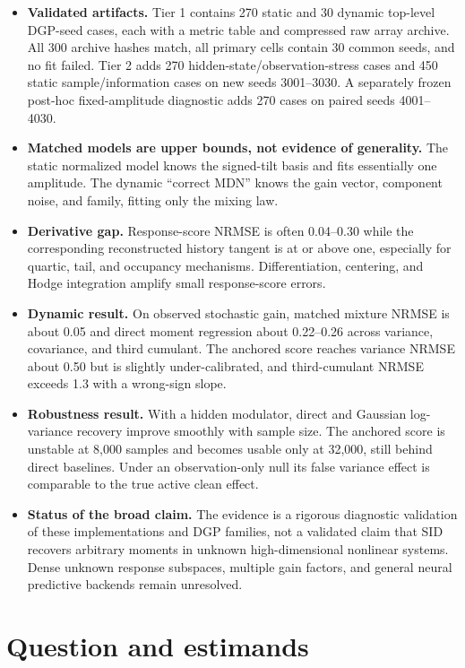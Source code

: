 \documentclass[11pt]{article}
\begin{document}
\begin{itemize}
\item \textbf{Validated artifacts.}  Tier 1 contains 270 static and 30 dynamic
top-level DGP-seed cases, each with a metric table and compressed raw array archive.
All 300 archive hashes match, all primary cells contain 30 common seeds, and no fit
failed.  Tier 2 adds 270 hidden-state/observation-stress cases and 450 static
sample/information cases on new seeds 3001--3030.  A separately frozen post-hoc
fixed-amplitude diagnostic adds 270 cases on paired seeds 4001--4030.
\item \textbf{Matched models are upper bounds, not evidence of generality.}  The
static normalized model knows the signed-tilt basis and fits essentially one
amplitude.  The dynamic ``correct MDN'' knows the gain vector, component noise, and
family, fitting only the mixing law.
\item \textbf{Derivative gap.}  Response-score NRMSE is often 0.04--0.30 while the
corresponding reconstructed history tangent is at or above one, especially for
quartic, tail, and occupancy mechanisms.  Differentiation, centering, and Hodge
integration amplify small response-score errors.
\item \textbf{Dynamic result.}  On observed stochastic gain, matched mixture NRMSE
is about 0.05 and direct moment regression about 0.22--0.26 across variance,
covariance, and third cumulant.  The anchored score reaches variance NRMSE about
0.50 but is slightly under-calibrated, and third-cumulant NRMSE exceeds 1.3 with a
wrong-sign slope.
\item \textbf{Robustness result.}  With a hidden modulator, direct and Gaussian
log-variance recovery improve smoothly with sample size.  The anchored score is
unstable at 8,000 samples and becomes usable only at 32,000, still behind direct
baselines.  Under an observation-only null its false variance effect is comparable
to the true active clean effect.
\item \textbf{Status of the broad claim.}  The evidence is a rigorous diagnostic
validation of these implementations and DGP families, not a validated claim that
SID recovers arbitrary moments in unknown high-dimensional nonlinear systems.
Dense unknown response subspaces, multiple gain factors, and general neural
predictive backends remain unresolved.
\end{itemize}

\section{Question and estimands}
\end{document}
